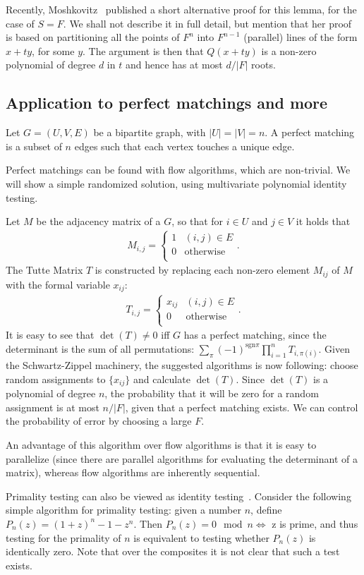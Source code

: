\documentclass{article}
\begin{document}
Recently, Moshkovitz~\cite{Moshkovitz:2010} published a short
alternative proof for this lemma, for the case of $S=F$. We shall not
describe it in full detail, but mention that her proof is based on
partitioning all the points of $F^n$ into $F^{n-1}$ (parallel) lines
of the form $x+ty$, for some $y$. The argument is then that $Q(x+ty)$
is a non-zero polynomial of degree $d$ in $t$ and hence has at most
$d/|F|$ roots.


\subsection{Application to perfect matchings and more}
Let $G=(U,V,E)$ be a bipartite graph, with $|U|=|V|=n$. A perfect
matching is a subset of $n$ edges such that each vertex touches a
unique edge.

Perfect matchings can be found with flow algorithms, which are
non-trivial. We will show a simple randomized solution, using
multivariate polynomial identity testing.

Let $M$ be the adjacency matrix of a $G$, so that for $i \in U$ and $j
\in V$ it holds that
\begin{align*}
M_{i,j}=
\begin{cases}
  1 & (i,j)\in E \\
  0 & \mathrm{otherwise} \\
\end{cases}.  
\end{align*}
The Tutte Matrix $T$ is constructed by replacing each non-zero element
$M_{ij}$ of $M$ with the formal variable $x_{ij}$:
\begin{align*}
T_{i,j}=
\begin{cases}
  x_{ij} & (i,j)\in E \\
  0 & \mathrm{otherwise} \\
\end{cases}.  
\end{align*}
It is easy to see that $\det(T)\neq 0$ iff $G$ has a perfect matching,
since the determinant is the sum of all permutations:
$\sum_{\pi}(-1)^{\mathrm{sgn} \pi}\prod_{i=1}^{n}T_{i,\pi(i)}$. Given
the Schwartz-Zippel machinery, the suggested algorithms is now
following: choose random assignments to $\{x_{ij}\}$ and calculate
$\det(T)$. Since $\det(T)$ is a polynomial of degree $n$, the
probability that it will be zero for a random assignment is at most
$n/|F|$, given that a perfect matching exists. We can control the
probability of error by choosing a large $F$.

An advantage of this algorithm over flow algorithms is that it is easy
to parallelize (since there are parallel algorithms for evaluating the
determinant of a matrix), whereas flow algorithms are inherently
sequential.


Primality testing can also be viewed as identity
testing~\cite{AgrawalBiswas:2003}. Consider the following simple
algorithm for primality testing: given a number $n$, define
$P_n(z)=(1+z)^{n}-1-z^n$. Then $P_n(z)=0 \mod n \iff$ z is prime, and
thus testing for the primality of $n$ is equivalent to testing whether
$P_n(z)$ is identically zero. Note that over the composites it is not
clear that such a test exists.

 
\end{document}
